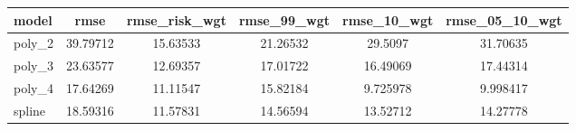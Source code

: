 \documentclass[]{article}
\begin{document}
\begin{tabular}{lccccc} \hline
model & rmse & rmse\_risk\_wgt & rmse\_99\_wgt & rmse\_10\_wgt & rmse\_05\_10\_wgt \\ \hline
poly\_2 & 39.79712 & 15.63533 & 21.26532 & 29.5097 & 31.70635 \\
poly\_3 & 23.63577 & 12.69357 & 17.01722 & 16.49069 & 17.44314 \\
poly\_4 & 17.64269 & 11.11547 & 15.82184 & 9.725978 & 9.998417 \\
 spline & 18.59316 & 11.57831 & 14.56594 & 13.52712 & 14.27778 \\ \hline
\end{tabular}
\end{document}
